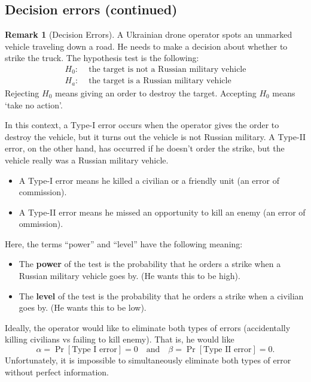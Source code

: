 \documentclass[10pt]{article}
\theoremstyle{definition}
\newtheorem{remark}[theorem]{Remark}
\newcommand{\1}[1]{\textbf{1}_{\left[#1\right]}} %
\begin{document}
\subsection{Decision errors (continued)}


\begin{remark}[Decision Errors]
  \label{rmk:decision-errors}
  A Ukrainian drone operator spots an unmarked vehicle traveling down a road.
  He needs to make a decision about whether to strike the truck. The
  hypothesis test is the following:
  \begin{align*}
    H_{0}:& \text{ the target is not a Russian military vehicle}\\
    H_{a}:& \text{ the target is a Russian military vehicle}
  \end{align*}
  Rejecting $H_{0}$ means giving an order to destroy the target. Accepting
  $H_{0}$ means `take no action'.

  In this context, a Type-I error occurs when the operator gives the order to
  destroy the vehicle, but it turns out the vehicle is not Russian military. A
  Type-II error, on the other hand, has occurred if he doesn't order the
  strike, but the vehicle really was a Russian military vehicle.
  \begin{itemize}
    \item A Type-I error means he killed a civilian or a friendly unit (an
    error of commission).
    \item A Type-II error means he missed an opportunity to kill an enemy (an
    error of ommission).
  \end{itemize}
  Here, the terms ``power'' and ``level'' have the following meaning:
  \begin{itemize}
    \item The \textbf{power} of the test is the probability that he
    orders a strike when a Russian military vehicle goes by. (He wants this
    to be high).
    \item The \textbf{level} of the test is the probability that he orders a
    strike when a civilian goes by. (He wants this to be low).
  \end{itemize}
  Ideally, the operator would like to eliminate both types of errors
  (accidentally killing civilians vs failing to kill enemy). That is, he
  would like
  \begin{equation*}
    \alpha=\Pr\left[\text{Type I error} \right]= 0 \quad \text{and} \quad
    \beta=\Pr\left[\text{Type II error} \right]=0.
  \end{equation*}
  Unfortunately, it is impossible to simultaneously eliminate both types of
  error without perfect information.


\end{remark}
\end{document}
